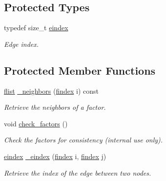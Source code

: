 \subsection*{Protected Types}
\begin{DoxyCompactItemize}
\item 
\hypertarget{classmerlin_1_1factor__graph_abec36f1f1a6ff2c0bfb74299851f9722}{}typedef size\+\_\+t \hyperlink{classmerlin_1_1factor__graph_abec36f1f1a6ff2c0bfb74299851f9722}{eindex}\label{classmerlin_1_1factor__graph_abec36f1f1a6ff2c0bfb74299851f9722}

\begin{DoxyCompactList}\small\item\em Edge index. \end{DoxyCompactList}\end{DoxyCompactItemize}
\subsection*{Protected Member Functions}
\begin{DoxyCompactItemize}
\item 
\hyperlink{classmerlin_1_1factor__graph_a48dec4ea8a655315053984a81fe93ebc}{flist} \hyperlink{classmerlin_1_1factor__graph_a54f75765bae775dfa08f0ba4b022ea87}{\+\_\+neighbors} (\hyperlink{classmerlin_1_1factor__graph_a533556bd4ec6961b63a91a80a8a37508}{findex} i) const 
\begin{DoxyCompactList}\small\item\em Retrieve the neighbors of a factor. \end{DoxyCompactList}\item 
\hypertarget{classmerlin_1_1factor__graph_a4d666ca5fce6365c35a5d30bef5016c4}{}void \hyperlink{classmerlin_1_1factor__graph_a4d666ca5fce6365c35a5d30bef5016c4}{check\+\_\+factors} ()\label{classmerlin_1_1factor__graph_a4d666ca5fce6365c35a5d30bef5016c4}

\begin{DoxyCompactList}\small\item\em Check the factors for consistency (internal use only). \end{DoxyCompactList}\item 
\hyperlink{classmerlin_1_1factor__graph_abec36f1f1a6ff2c0bfb74299851f9722}{eindex} \hyperlink{classmerlin_1_1factor__graph_ad167336dbf3fa30cfb4844c3d4fd1a37}{\+\_\+eindex} (\hyperlink{classmerlin_1_1factor__graph_a533556bd4ec6961b63a91a80a8a37508}{findex} i, \hyperlink{classmerlin_1_1factor__graph_a533556bd4ec6961b63a91a80a8a37508}{findex} j)
\begin{DoxyCompactList}\small\item\em Retrieve the index of the edge between two nodes. \end{DoxyCompactList}\end{DoxyCompactItemize}
